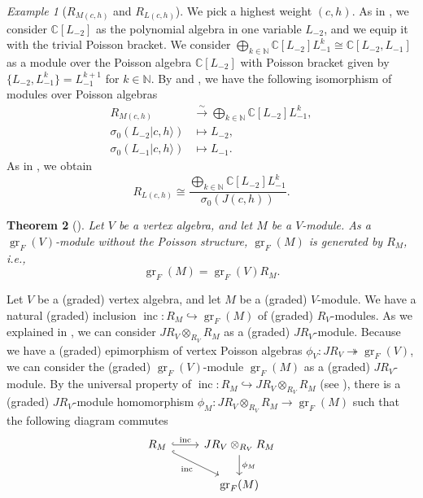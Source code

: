 \documentclass[a4paper, 12pt, reqno]{amsart}
\newtheorem{theorem}{Theorem}[section]
\theoremstyle{remark}
\newtheorem{example}[theorem]{Example}
\DeclareMathOperator{\gr}{gr}
\DeclareMathOperator{\inc}{inc}
\begin{document}
\begin{example}[$R_{M(c, h)}$ and $R_{L(c, h)}$]
  \label{exa:16}
  We pick a highest weight $(c, h)$.
  As in , we consider $\mathbb{C}[L_{-2}]$ as the polynomial algebra in one variable $L_{-2}$, and we equip it with the trivial Poisson bracket.
  We consider $\bigoplus_{k \in \mathbb{N}}\mathbb{C}[L_{-2}]L_{-1}^k \cong \mathbb{C}[L_{-2}, L_{-1}]$ as a module over the Poisson algebra $\mathbb{C}[L_{-2}]$ with Poisson bracket given by $\{L_{-2}, L_{-1}^k\} = L_{-1}^{k + 1}$ for $k \in \mathbb{N}$.
  By  and , we have the following isomorphism of modules over Poisson algebras
  \begin{align*}
    R_{M(c, h)} &\xrightarrow{\sim} \bigoplus_{k \in \mathbb{N}}\mathbb{C}[L_{-2}]L_{-1}^k, \\
    \sigma_0(L_{-2}|c, h\rangle) &\mapsto L_{-2}, \\
    \sigma_0(L_{-1}|c, h\rangle) &\mapsto L_{-1}.
  \end{align*}
  As in , we obtain
  \begin{equation*}
    R_{L(c, h)} \cong \frac{\bigoplus_{k \in \mathbb{N}}\mathbb{C}[L_{-2}]L_{-1}^k}{\sigma_0(J(c, h))}.
  \end{equation*}
\end{example}

\begin{theorem}[{\cite[Lemma 4.2]{li_abelianizing_2005}}]
  \label{thr:12}
  Let $V$ be a vertex algebra, and let $M$ be a $V$-module.
  As a $\gr_F(V)$-module without the Poisson structure, $\gr_F(M)$ is generated by $R_M$, i.e.,
  \begin{equation*}
    \gr_F(M) = \gr_F(V)R_M.
  \end{equation*}
\end{theorem}

Let $V$ be a (graded) vertex algebra, and let $M$ be a (graded) $V$-module.
We have a natural (graded) inclusion $\inc: R_M \hookrightarrow \gr_F(M)$ of (graded) $R_V$-modules.
As we explained in , we can consider $JR_V \otimes_{R_V} R_M$ as a (graded) $JR_V$-module.
Because we have a (graded) epimorphism of vertex Poisson algebras $\phi_V: JR_V \twoheadrightarrow \gr_F(V)$, we can consider the (graded) $\gr_F(V)$-module $\gr_F(M)$ as a (graded) $JR_V$-module.
By the universal property of $\inc: R_M \hookrightarrow JR_V \otimes_{R_V} R_M$ (see ), there is a (graded) $JR_V$-module homomorphism $\phi_M: JR_V \otimes_{R_V} R_M \to \gr_F(M)$ such that the following diagram commutes
\begin{equation*}
  \begin{tikzcd}
    R_M \arrow[r, "\inc", hook] \arrow[rd, "\inc"', hook] & JR_V \otimes_{R_V} R_M \arrow[d, "\phi_M"] \\
    & \gr_F(M)
  \end{tikzcd}
\end{equation*}
\end{document}
